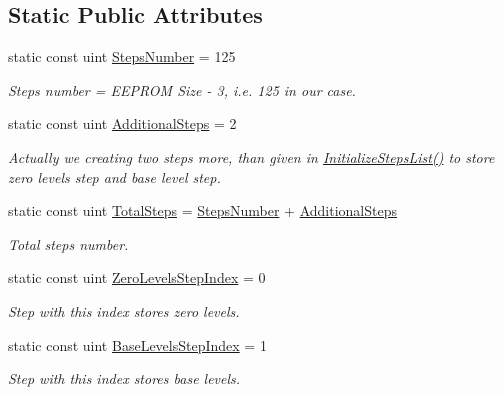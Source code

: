 \subsection*{Static Public Attributes}
\begin{DoxyCompactItemize}
\item 
\mbox{\label{class_settings_generator_a157c342983c2943653d10e6e854d3d5e}} 
static const uint \hyperlink{class_settings_generator_a157c342983c2943653d10e6e854d3d5e}{Steps\+Number} = 125
\begin{DoxyCompactList}\small\item\em Steps number = E\+E\+P\+R\+OM Size -\/ 3, i.\+e. 125 in our case. \end{DoxyCompactList}\item 
\mbox{\label{class_settings_generator_af8f91fd5fd02a587aba2d217ede43e49}} 
static const uint \hyperlink{class_settings_generator_af8f91fd5fd02a587aba2d217ede43e49}{Additional\+Steps} = 2
\begin{DoxyCompactList}\small\item\em Actually we creating two steps more, than given in \hyperlink{class_settings_generator_a84b81d11cb5f83d4066e73a03acfc143}{Initialize\+Steps\+List()} to store zero levels step and base level step. \end{DoxyCompactList}\item 
\mbox{\label{class_settings_generator_a21eb4eb09a0ff27bc530b56d34ed2e0c}} 
static const uint \hyperlink{class_settings_generator_a21eb4eb09a0ff27bc530b56d34ed2e0c}{Total\+Steps} = \hyperlink{class_settings_generator_a157c342983c2943653d10e6e854d3d5e}{Steps\+Number} + \hyperlink{class_settings_generator_af8f91fd5fd02a587aba2d217ede43e49}{Additional\+Steps}
\begin{DoxyCompactList}\small\item\em Total steps number. \end{DoxyCompactList}\item 
\mbox{\label{class_settings_generator_a45b535223390381aba891c7fa7e7a29f}} 
static const uint \hyperlink{class_settings_generator_a45b535223390381aba891c7fa7e7a29f}{Zero\+Levels\+Step\+Index} = 0
\begin{DoxyCompactList}\small\item\em Step with this index stores zero levels. \end{DoxyCompactList}\item 
\mbox{\label{class_settings_generator_aecf7db8691db606782959548c0aa4ff8}} 
static const uint \hyperlink{class_settings_generator_aecf7db8691db606782959548c0aa4ff8}{Base\+Levels\+Step\+Index} = 1
\begin{DoxyCompactList}\small\item\em Step with this index stores base levels. \end{DoxyCompactList}\end{DoxyCompactItemize}


